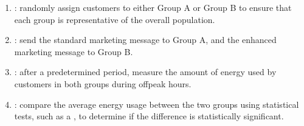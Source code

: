 \documentclass[letterpaper,10pt,english]{jupyterBook}
\begin{document}
\sphinxAtStartPar
{}
\begin{enumerate}
%
\item {} 
\sphinxAtStartPar
{}: randomly assign customers to either Group A or Group B to ensure that each group is representative of the overall population.

\item {} 
\sphinxAtStartPar
{}: send the standard marketing message to Group A, and the enhanced marketing message to Group B.

\item {} 
\sphinxAtStartPar
{}: after a predetermined period, measure the amount of energy used by customers in both groups during off\sphinxhyphen{}peak hours.

\item {} 
\sphinxAtStartPar
{}: compare the average energy usage between the two groups using statistical tests, such as a , to determine if the difference is statistically significant.

\end{enumerate}
\end{document}
